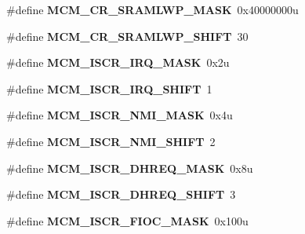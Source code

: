 \begin{DoxyCompactItemize}
\item 
\#define {\bfseries M\+C\+M\+\_\+\+C\+R\+\_\+\+S\+R\+A\+M\+L\+W\+P\+\_\+\+M\+A\+SK}~0x40000000u\hypertarget{group__MCM__Register__Masks_ga93830e2785e77585febe87f0bc83da5c}{}\label{group__MCM__Register__Masks_ga93830e2785e77585febe87f0bc83da5c}

\item 
\#define {\bfseries M\+C\+M\+\_\+\+C\+R\+\_\+\+S\+R\+A\+M\+L\+W\+P\+\_\+\+S\+H\+I\+FT}~30\hypertarget{group__MCM__Register__Masks_ga7c3a04f9ed4a8824e212536c1d783fea}{}\label{group__MCM__Register__Masks_ga7c3a04f9ed4a8824e212536c1d783fea}

\item 
\#define {\bfseries M\+C\+M\+\_\+\+I\+S\+C\+R\+\_\+\+I\+R\+Q\+\_\+\+M\+A\+SK}~0x2u\hypertarget{group__MCM__Register__Masks_ga86ab0b13f7c720c3b9ad33950745d05d}{}\label{group__MCM__Register__Masks_ga86ab0b13f7c720c3b9ad33950745d05d}

\item 
\#define {\bfseries M\+C\+M\+\_\+\+I\+S\+C\+R\+\_\+\+I\+R\+Q\+\_\+\+S\+H\+I\+FT}~1\hypertarget{group__MCM__Register__Masks_ga68080cbb94f82b92990da0f06b9e1fe2}{}\label{group__MCM__Register__Masks_ga68080cbb94f82b92990da0f06b9e1fe2}

\item 
\#define {\bfseries M\+C\+M\+\_\+\+I\+S\+C\+R\+\_\+\+N\+M\+I\+\_\+\+M\+A\+SK}~0x4u\hypertarget{group__MCM__Register__Masks_ga5ca1ab81de3e013c750ffb5afc5608d3}{}\label{group__MCM__Register__Masks_ga5ca1ab81de3e013c750ffb5afc5608d3}

\item 
\#define {\bfseries M\+C\+M\+\_\+\+I\+S\+C\+R\+\_\+\+N\+M\+I\+\_\+\+S\+H\+I\+FT}~2\hypertarget{group__MCM__Register__Masks_ga57455aab19203d7226d9077d8be59a56}{}\label{group__MCM__Register__Masks_ga57455aab19203d7226d9077d8be59a56}

\item 
\#define {\bfseries M\+C\+M\+\_\+\+I\+S\+C\+R\+\_\+\+D\+H\+R\+E\+Q\+\_\+\+M\+A\+SK}~0x8u\hypertarget{group__MCM__Register__Masks_ga8c932ffbc33cc5872065ee34f7bd2f0b}{}\label{group__MCM__Register__Masks_ga8c932ffbc33cc5872065ee34f7bd2f0b}

\item 
\#define {\bfseries M\+C\+M\+\_\+\+I\+S\+C\+R\+\_\+\+D\+H\+R\+E\+Q\+\_\+\+S\+H\+I\+FT}~3\hypertarget{group__MCM__Register__Masks_gac03fba0494ea82e25a9b865d863f79ea}{}\label{group__MCM__Register__Masks_gac03fba0494ea82e25a9b865d863f79ea}

\item 
\#define {\bfseries M\+C\+M\+\_\+\+I\+S\+C\+R\+\_\+\+F\+I\+O\+C\+\_\+\+M\+A\+SK}~0x100u\hypertarget{group__MCM__Register__Masks_ga701558b3e4efc5c15bea4770c14a43ff}{}\label{group__MCM__Register__Masks_ga701558b3e4efc5c15bea4770c14a43ff}


\end{DoxyCompactItemize}
